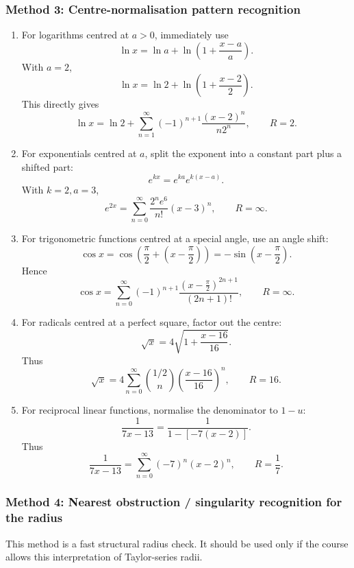 \documentclass[12pt]{article}
\begin{document}
\newpage
\subsubsection{Method 3: Centre-normalisation pattern recognition}

\begin{enumerate}[label=(\alph*)]

\item
For logarithms centred at \(a>0\), immediately use
\[
\ln x=\ln a+\ln\left(1+\frac{x-a}{a}\right).
\]
With \(a=2\),
\[
\ln x=\ln2+\ln\left(1+\frac{x-2}{2}\right).
\]
This directly gives
\[
\boxed{
\ln x=\ln2+\sum_{n=1}^{\infty}(-1)^{n+1}\frac{(x-2)^n}{n2^n}},
\qquad
\boxed{R=2.}
\]

\item
For exponentials centred at \(a\), split the exponent into a constant part plus a shifted part:
\[
e^{kx}=e^{ka}e^{k(x-a)}.
\]
With \(k=2,a=3\),
\[
\boxed{
e^{2x}=\sum_{n=0}^{\infty}\frac{2^ne^6}{n!}(x-3)^n},
\qquad
\boxed{R=\infty.}
\]

\item
For trigonometric functions centred at a special angle, use an angle shift:
\[
\cos x=\cos\left(\frac{\pi}{2}+\left(x-\frac{\pi}{2}\right)\right)
=-\sin\left(x-\frac{\pi}{2}\right).
\]
Hence
\[
\boxed{
\cos x=
\sum_{n=0}^{\infty}(-1)^{n+1}
\frac{\left(x-\frac{\pi}{2}\right)^{2n+1}}{(2n+1)!}},
\qquad
\boxed{R=\infty.}
\]

\item
For radicals centred at a perfect square, factor out the centre:
\[
\sqrt{x}=4\sqrt{1+\frac{x-16}{16}}.
\]
Thus
\[
\boxed{
\sqrt{x}=4\sum_{n=0}^{\infty}\binom{1/2}{n}\left(\frac{x-16}{16}\right)^n},
\qquad
\boxed{R=16.}
\]

\item
For reciprocal linear functions, normalise the denominator to \(1-u\):
\[
\frac1{7x-13}
=
\frac1{1-[-7(x-2)]}.
\]
Thus
\[
\boxed{
\frac1{7x-13}=\sum_{n=0}^{\infty}(-7)^n(x-2)^n},
\qquad
\boxed{R=\frac17.}
\]

\end{enumerate}

\newpage
\subsubsection{Method 4: Nearest obstruction / singularity recognition for the radius}

This method is a fast structural radius check. It should be used only if the course allows
this interpretation of Taylor-series radii.
\end{document}
